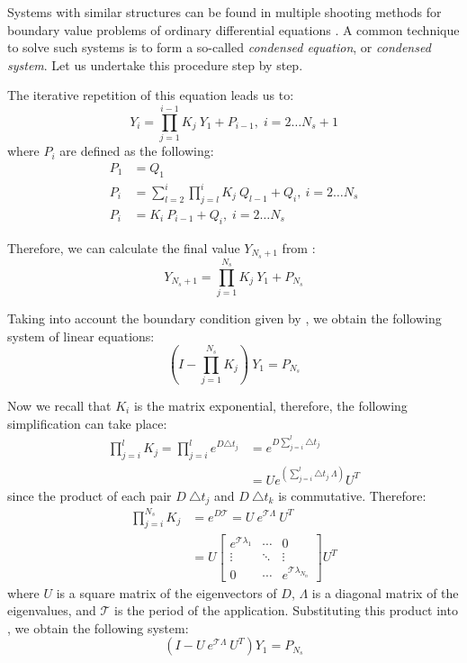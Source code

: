 Systems with similar structures can be found in multiple shooting methods for boundary value problems of ordinary differential equations \cite{stoer2002}. A common technique to solve such systems is to form a so-called \emph{condensed equation}, or \emph{condensed system}. Let us undertake this procedure step by step.

The iterative repetition of this equation leads us to:
\begin{equation} \label{eq:y-recurrent}
  Y_i = \prod_{j = 1}^{i - 1} K_j \: Y_1 + P_{i - 1}, \; i = 2 \dots N_s + 1
\end{equation}
where $P_i$ are defined as the following:
\begin{align}
  P_1 & = Q_1 \nonumber \\
  P_i & = \sum_{l = 2}^i \prod_{j = l}^i K_j \: Q_{l - 1} + Q_i, \: i = 2 \dots N_s \nonumber \\
  P_i & = K_i \: P_{i - 1} + Q_i, \; i = 2 \dots N_s \label{eq:p-recurrent}
\end{align}

Therefore, we can calculate the final value $Y_{N_s + 1}$ from :
\[
  Y_{N_s + 1} = \prod_{j = 1}^{N_s} K_j \: Y_1 + P_{N_s}
\]

Taking into account the boundary condition given by , we obtain the following system of linear equations:
\begin{equation} \label{eq:core-system}
  (I - \prod_{j = 1}^{N_s} K_j) \: Y_1 = P_{N_s}
\end{equation}

Now we recall that $K_i$ is the matrix exponential, therefore, the following simplification can take place:
\begin{align*}
  \prod_{j = i}^l K_j = \prod_{j = i}^l e^{D \triangle t_j} & = e^{D \sum_{j = i}^l \triangle t_j} \\
  & = U e^{\left( \sum_{j = i}^l \triangle t_j \: \Lambda \right)} U^T
\end{align*}
since the product of each pair $D \: \triangle t_j$ and $D \: \triangle t_k$ is commutative. Therefore:
\begin{align*}
  \prod_{j = i}^{N_s} K_j & = e^{D \mathcal{T}} = U \: e^{\mathcal{T} \Lambda} \: U^T \\
    & = U \left[
      \begin{array}{ccc}
        e^{\mathcal{T} \lambda_1} & \cdots & 0 \\
        \vdots & \ddots & \vdots \\
        0 & \cdots & e^{\mathcal{T} \lambda_{N_n}}
      \end{array}
    \right] U^T
\end{align*}
where $U$ is a square matrix of the eigenvectors of $D$, $\Lambda$ is a diagonal matrix of the eigenvalues, and $\mathcal{T}$ is the period of the application. Substituting this product into , we obtain the following system:
\[
  (I - U \: e^{\mathcal{T} \Lambda} \: U^T) Y_1 = P_{N_s}
\]

